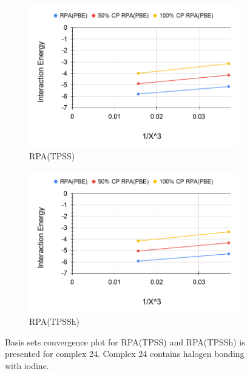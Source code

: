 \documentclass[11pt]{article}
\begin{document}
\begin{figure}[hbpt]
  \centering
  \begin{subfigure}{.5\textwidth}
    \centering
    \includegraphics[scale=0.3]{tpss-24.png}
    \caption{RPA(TPSS)}
    \label{fig:tpss_24}
  \end{subfigure}%
  \begin{subfigure}{.5\textwidth}
    \centering
    \includegraphics[scale=0.3]{tpssh-24.png}
    \caption{RPA(TPSSh)}
    \label{fig:tpssh_24}
  \end{subfigure}
  \caption{Basis sets convergence plot for RPA(TPSS) and RPA(TPSSh) is
    presented for complex 24. Complex 24 contains halogen bonding with
    iodine.}
  \label{fig:complex_24}
\end{figure}
\end{document}
